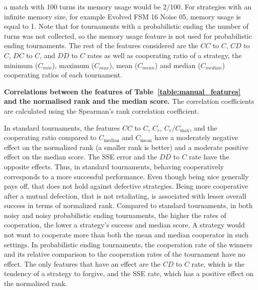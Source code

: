 \documentclass{article}
\begin{document}
\begin{table}[!htbp]
{    a match with 100 turns its memory usage would be 2/100. For strategies with an
    infinite memory size, for example Evolved FSM 16 Noise 05, memory usage is equal
    to 1. Note that for tournaments with a probabilistic ending the number of turns
    was not collected, so the memory usage feature is not used for probabilistic
    ending tournaments. The rest of the features considered are the $CC$
    to $C$, $CD$ to $C$, $DC$ to $C$, and $DD$ to $C$ rates as well as
    cooperating ratio of a strategy, the minimum (\(C_{min}\)), maximum
    (\(C_{max}\)), mean (\(C_{mean}\)) and median (\(C_{median}\)) cooperating
    ratios of each tournament.}
    \label{table:manual_features}
\end{table}

\begin{table}[!htbp]
    \begin{center}
    \resizebox{.8\textwidth}{!}{
        
    }
\end{center}
\caption{\textbf{Correlations between the features of Table~\ref{table:manual_features}
and the normalised rank and the median score.}
The correlation coefficients are calculated using the Spearman's rank
correlation coefficient.}\label{table:correlations}
\end{table}

In standard tournaments, the features \(CC\) to \(C\), \(C_r\), \(C_r /
C_{\text{max}}\), and the cooperating ratio compared to \(C_{\text{median}}\)
and \(C_{\text{mean}}\) have a moderately negative effect on the normalized rank
(a smaller rank is better) and a moderate positive effect on the median score.
The SSE error and the \(DD\) to \(C\) rate have the opposite effects. Thus, in
standard tournaments, behaving cooperatively corresponds to a more successful
performance. Even though being nice generally pays off, that does not hold
against defective strategies. Being more cooperative after a mutual defection,
that is not retaliating, is associated with lesser overall success in terms of
normalized rank.
Compared to standard tournaments, in both noisy and noisy probabilistic ending
tournaments, the higher the rates of cooperation, the lower a strategy's success
and median score. A strategy would not want to cooperate more than both the mean
and median cooperator in such settings. In probabilistic ending tournaments, the
cooperation rate of the winners and its relative comparison to the cooperation
rates of the tournament have no effect. The only features that have an effect
are the \(CD\) to \(C\) rate, which is the tendency of a strategy to forgive,
and the SSE rate, which has a positive effect on the normalized rank.
\end{document}
